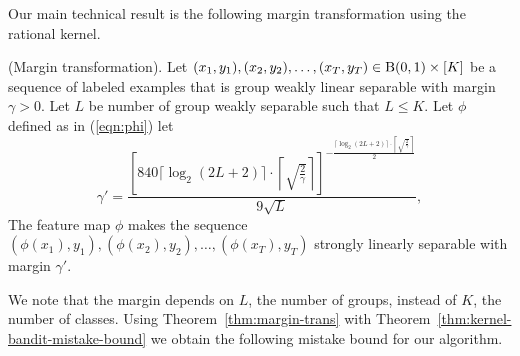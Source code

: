 Our main technical result is the following margin transformation using the rational kernel.

\begin{theorem}
(Margin transformation). Let $(x_1,y_1),(x_2,y_2),\ldots,(x_T,y_T)\in {\mathrm{B}}(0,1)\times [K]$
be a sequence of labeled examples that is group weakly linear separable with margin $\gamma >0$.
Let $L$ be number of group weakly separable such that $L\leq K.$
Let $\phi$ defined as in (\ref{eqn:phi}) let
\[
    \gamma' = \frac{\left[840\lceil\log_2(2L+2)\rceil\cdot\left\lceil\sqrt{\frac{2}{\gamma}}\right\rceil\right]^{-\frac{\lceil\log_2(2L+2)\rceil\cdot\left\lceil\sqrt{\frac{2}{\gamma}}\right\rceil}{2}}}{9\sqrt{L}},
\]
The feature map $\phi$ makes the sequence $(\phi (x_1),y_1),(\phi (x_2),y_2),\ldots,(\phi (x_T),y_T)$
strongly linearly separable with margin $\gamma'$.
\label{thm:margin-trans}
\end{theorem}

We note that the margin depends on $L$, the number of groups, instead of $K$, the number of classes.  Using Theorem~\ref{thm:margin-trans} with Theorem~\ref{thm:kernel-bandit-mistake-bound} we obtain the following mistake bound for our algorithm.

